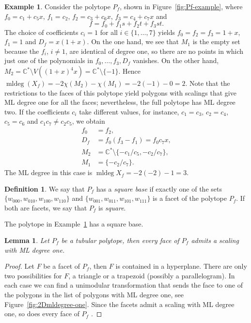 \documentclass[12pt,reqno]{amsart}   	%
\theoremstyle{plain}
\newtheorem{lemma}[theorem]{Lemma}
\theoremstyle{definition}
\newtheorem{definition}[theorem]{Definition}
\newtheorem{example}[theorem]{Example}
\theoremstyle{remark}
\newcommand{\C}{\mathbb{C}}
\newcommand{\mldeg}{\operatorname{mldeg}}
\begin{document}
\begin{example} \label{ex:simplex-cut}
Consider the polytope $P_f$, shown in Figure~\ref{fig:Pf-example}, where $f_0=c_1+c_5x$, $f_1=c_2$, $f_2=c_3+c_6x$,
$f_3=c_4+c_7x$ and 
\[f= f_0+ f_1 s + f_2t+ f_3st.\]
The choice of coefficients $c_i=1$ for all $i\in\{1,\ldots,7\}$ yields 
$f_0=f_2=f_3=1+x$, $f_1=1$ and $D_f=x(1+x)$. On the one hand, we see that $M_1$ 
is the empty set because the $f_i$, $i\neq 1$, are identical of degree one, so 
there are no points in which just one of the polynomials in $f_0,\ldots,f_3,D_f$ vanishes. On the other hand, $M_2= \C^{\ast}\setminus V((1+x)^4x)=\C^\ast\setminus \{-1\}$. Hence $\mldeg(X_{f})= -2 \chi(M_2) - \chi(M_1) = -2(-1) - 0 = 2.$ Note that the restrictions
to the faces of this polytope yield polygons with scalings that give ML degree one for all the faces; nevertheless, the full polytope
has ML degree two.
If the coefficients $c_i$ take different values, for instance, $c_1=c_3$, $c_2=c_4$, $c_5=c_6$ and $c_1c_7\neq c_2 c_5$, we obtain
\[
    \begin{split}
        f_0 &= f_2,\\
        D_f &= f_0(f_3-f_1) = f_0c_7x,\\
        M_2 &= \C^* \setminus \{-c_1/c_5,-c_2/c_7\},\\
        M_1 &= \{-c_2/c_7\}.
    \end{split}
\]
The ML degree in this case is
$   \mldeg X_f = -2(-2) - 1 = 3$.
\end{example}
\begin{definition}\label{def:squarebase}
   We say that $P_f$ has a \textit{square base} if exactly one of the sets $\{w_{000},w_{010},w_{100},w_{110}\}$ and  $\{ w_{001},w_{011},w_{101},w_{111}\}$ is a facet of the polytope $P_f$. If both are facets, we say that $P_f$ is \textit{square}. 
\end{definition}
 The polytope in Example~\ref{ex:simplex-cut} has a square base.
 \begin{lemma}\label{lem:faces}
Let $P_f$ be a tubular polytope, then every face of $P_f$ admits a scaling with ML degree one.
\end{lemma}
\begin{proof}
Let $F$ be a facet of $P_f$, then $F$ is contained in a hyperplane. There are only two possibilities for $F$, a triangle or a trapezoid (possibly a parallelogram). In each case we can find a unimodular transformation that sends the face to one of the polygons
in the list of polygons with ML degree one, see Figure~\ref{fig:2Dmldegree-one}.
Since the facets admit a scaling with ML degree one, so does every face of $P_f$
\cite{coons2021,amendola2025}.
\end{proof}
\end{document}
